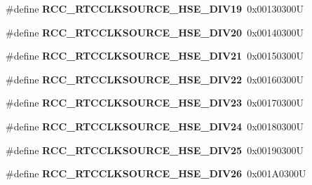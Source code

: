 \begin{DoxyCompactItemize}
\#define {\bfseries R\+C\+C\+\_\+\+R\+T\+C\+C\+L\+K\+S\+O\+U\+R\+C\+E\+\_\+\+H\+S\+E\+\_\+\+D\+I\+V19}~0x00130300U
\item 
\mbox{\label{group___r_c_c___r_t_c___clock___source_gab72789d4d0c5de2a7e771d538567b92e}} 
\#define {\bfseries R\+C\+C\+\_\+\+R\+T\+C\+C\+L\+K\+S\+O\+U\+R\+C\+E\+\_\+\+H\+S\+E\+\_\+\+D\+I\+V20}~0x00140300U
\item 
\mbox{\label{group___r_c_c___r_t_c___clock___source_ga70a0ee7e610273af753eca611e959dfc}} 
\#define {\bfseries R\+C\+C\+\_\+\+R\+T\+C\+C\+L\+K\+S\+O\+U\+R\+C\+E\+\_\+\+H\+S\+E\+\_\+\+D\+I\+V21}~0x00150300U
\item 
\mbox{\label{group___r_c_c___r_t_c___clock___source_ga02eac6a5a2eec79514d1637c747d69aa}} 
\#define {\bfseries R\+C\+C\+\_\+\+R\+T\+C\+C\+L\+K\+S\+O\+U\+R\+C\+E\+\_\+\+H\+S\+E\+\_\+\+D\+I\+V22}~0x00160300U
\item 
\mbox{\label{group___r_c_c___r_t_c___clock___source_gac707188b45213d39ad11e2440f77e235}} 
\#define {\bfseries R\+C\+C\+\_\+\+R\+T\+C\+C\+L\+K\+S\+O\+U\+R\+C\+E\+\_\+\+H\+S\+E\+\_\+\+D\+I\+V23}~0x00170300U
\item 
\mbox{\label{group___r_c_c___r_t_c___clock___source_gabc9c05156ca310200f3716af4209594a}} 
\#define {\bfseries R\+C\+C\+\_\+\+R\+T\+C\+C\+L\+K\+S\+O\+U\+R\+C\+E\+\_\+\+H\+S\+E\+\_\+\+D\+I\+V24}~0x00180300U
\item 
\mbox{\label{group___r_c_c___r_t_c___clock___source_gaef79b940c2bcfee57380e23c4e893767}} 
\#define {\bfseries R\+C\+C\+\_\+\+R\+T\+C\+C\+L\+K\+S\+O\+U\+R\+C\+E\+\_\+\+H\+S\+E\+\_\+\+D\+I\+V25}~0x00190300U
\item 
\mbox{\label{group___r_c_c___r_t_c___clock___source_gaa3d9b9568edda64d88361e76a3a50ed0}} 
\#define {\bfseries R\+C\+C\+\_\+\+R\+T\+C\+C\+L\+K\+S\+O\+U\+R\+C\+E\+\_\+\+H\+S\+E\+\_\+\+D\+I\+V26}~0x001\+A0300U
\item 
\mbox{\label{group___r_c_c___r_t_c___clock___source_ga65afd29f069e2e9b607212876d7860e5}} 

\end{DoxyCompactItemize}
